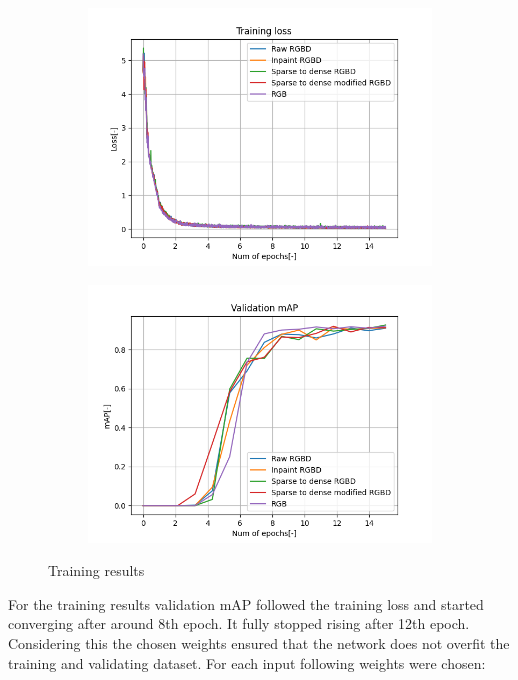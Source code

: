 \documentclass[twoside]{ctuthesis}
\theoremstyle{plain}
\theoremstyle{definition}
\theoremstyle{note}
\begin{document}
\begin{figure}[h]
	\centering
	\begin{subfigure}[b]{0.49\textwidth}
		\centering
		\includegraphics[width=\textwidth]{train_loss.png}
	\end{subfigure}
	\hfill
	\begin{subfigure}[b]{0.49\textwidth}
		\centering
		\includegraphics[width=\textwidth]{validation_mAP.png}
	\end{subfigure}
	\caption{Training results}
\end{figure}
For the training results validation mAP followed the training loss and started converging after around 8th epoch. It fully stopped rising after 12th epoch. Considering this the chosen weights ensured that the network does not overfit the training and validating dataset. For each input following weights were chosen:
\end{document}
